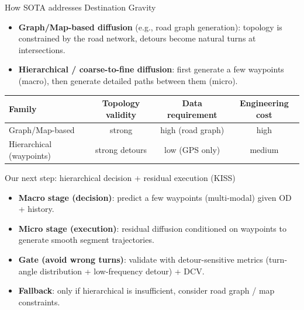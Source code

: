 \documentclass[aspectratio=169]{beamer}
\begin{document}
\begin{frame}{How SOTA addresses Destination Gravity}
\begin{itemize}
  \item \textbf{Graph/Map-based diffusion} (e.g., road graph generation): topology is constrained by the road network, detours become natural turns at intersections.
  \item \textbf{Hierarchical / coarse-to-fine diffusion}: first generate a few waypoints (macro), then generate detailed paths between them (micro).
\end{itemize}
\vspace{0.4em}
\begin{table}
  \centering
  \begin{tabular}{lccc}
    \toprule
    Family & Topology validity & Data requirement & Engineering cost \\
    \midrule
    Graph/Map-based & strong & high (road graph) & high \\
    Hierarchical (waypoints) & strong detours & low (GPS only) & medium \\
    \bottomrule
  \end{tabular}
\end{table}
\end{frame}

\begin{frame}{Our next step: hierarchical decision + residual execution (KISS)}
\begin{itemize}
  \item \textbf{Macro stage (decision)}: predict a few waypoints (multi-modal) given OD + history.
  \item \textbf{Micro stage (execution)}: residual diffusion conditioned on waypoints to generate smooth segment trajectories.
  \item \textbf{Gate (avoid wrong turns)}: validate with detour-sensitive metrics (turn-angle distribution + low-frequency detour) + DCV.
  \item \textbf{Fallback}: only if hierarchical is insufficient, consider road graph / map constraints.
\end{itemize}
\end{frame}
\end{document}

